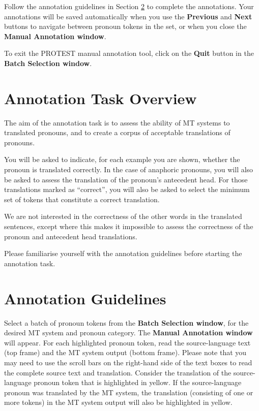 \documentclass[11pt]{article} %
\begin{document}
Follow the annotation guidelines in Section \ref{AnnotationGuidelines} to complete the annotations. Your annotations will be saved automatically when you use the \textbf{Previous} and \textbf{Next} buttons to navigate between pronoun tokens in the set, or when you close the \textbf{Manual Annotation window}.

To exit the PROTEST manual annotation tool, click on the \textbf{Quit} button in the \textbf{Batch Selection window}.


\section{Annotation Task Overview}
The aim of the annotation task is to assess the ability of MT systems to translated pronouns, and to create a corpus of acceptable translations of pronouns.

You will be asked to indicate, for each example you are shown, whether the pronoun is translated correctly. In the case of anaphoric pronouns, you will also be asked to assess the translation of the pronoun's antecedent head. For those translations marked as ``correct'', you will also be asked to select the minimum set of tokens that constitute a correct translation.

We are not interested in the correctness of the other words in the translated sentences, except where this makes it impossible to assess the correctness of the pronoun and antecedent head translations.

Please familiarise yourself with the annotation guidelines before starting the annotation task.


\section{Annotation Guidelines}
\label{AnnotationGuidelines}
Select a batch of pronoun tokens from the \textbf{Batch Selection window}, for the desired MT system and pronoun category. The \textbf{Manual Annotation window} will appear. For each highlighted pronoun token, read the source-language text (top frame) and the MT system output (bottom frame). Please note that you may need to use the scroll bars on the right-hand side of the text boxes to read the complete source text and translation. Consider the translation of the source-language pronoun token that is highlighted in yellow. If the source-language pronoun was translated by the MT system, the translation (consisting of one or more tokens) in the MT system output will also be highlighted in yellow.
\end{document}
